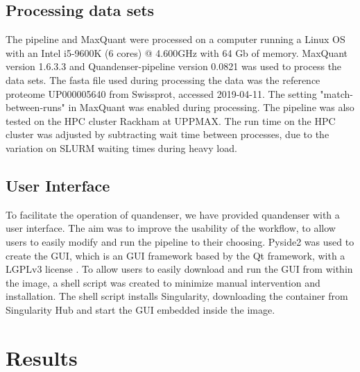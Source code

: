 \documentclass[11pt]{article}
\begin{document}
\subsection*{Processing data sets}
The pipeline and MaxQuant were processed on a computer running a Linux OS with an Intel i5-9600K (6 cores) @ 4.600GHz with 64 Gb of memory. MaxQuant version 1.6.3.3 and Quandenser-pipeline version 0.0821 was used to process the data sets. The fasta file used during processing the data was the reference proteome UP000005640 from Swissprot, accessed 2019-04-11. The setting "match-between-runs" in MaxQuant was enabled during processing. The pipeline was also tested on the HPC cluster Rackham at UPPMAX. The run time on the HPC cluster was adjusted by subtracting wait time between processes, due to the variation on SLURM waiting times during heavy load.


\subsection*{User Interface}
To facilitate the operation of quandenser, we have provided quandenser with a user interface. The aim was to improve the usability of the workflow, to allow users to easily modify and run the pipeline to their choosing. Pyside2 was used to create the GUI, which is an GUI framework based by the Qt framework, with a LGPLv3 license \cite{pyside2}. To allow users to easily download and run the GUI from within the image, a shell script was created to minimize manual intervention and installation. The shell script installs Singularity, downloading the container from Singularity Hub and start the GUI embedded inside the image.

\section*{Results}
\end{document}

